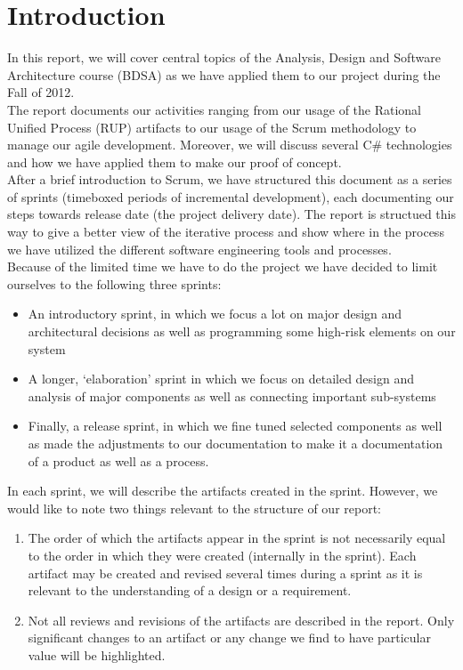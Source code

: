 \section{Introduction}
In this report, we will cover central topics of the Analysis, Design and Software Architecture course (BDSA) as we have applied them to our project during the Fall of 2012.\\
\newline
The report documents our activities ranging from our usage of the Rational Unified Process (RUP) artifacts \cite[p.~31]{OOAD} to our usage of the Scrum methodology to manage our agile development. Moreover, we will discuss several C\# technologies and how we have applied them to make our proof of concept.\\
\newline
After a brief introduction to Scrum, we have structured this document as a series of sprints (timeboxed periods of incremental development), each documenting our steps towards release date (the project delivery date). The report is structued this way to give a better view of the iterative process and show where in the process we have utilized the different software engineering tools and processes.\\
\newline
Because of the limited time we have to do the project we have decided to limit ourselves to the following three sprints:\\
\begin{itemize}
\item An introductory sprint, in which we focus a lot on major design and architectural decisions as well as programming some high-risk elements on our system
\item A longer, ‘elaboration’ sprint in which we focus on detailed design and analysis of major components as well as connecting important sub-systems 
\item Finally, a release sprint, in which we fine tuned selected components as well as made the adjustments to our documentation to make it a documentation of a product as well as a process.
\end{itemize}
\newline
In each sprint, we will describe the artifacts created in the sprint. However,
we would like to note two things relevant to the structure of our report:\\
\begin{enumerate}
\item The order of which the artifacts appear in the sprint is not necessarily equal to the
  order in which they were created (internally in the sprint). Each artifact
  may be created and revised several times during a sprint as it is relevant
  to the understanding of a design or a requirement. 
\item Not all reviews and revisions of the artifacts are described in the
  report. Only significant changes to an artifact or any change we find to have particular value will be highlighted.
\end{enumerate}
